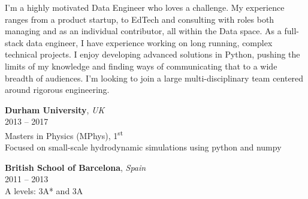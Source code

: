 \documentclass[a4paper]{limecv}
\begin{document}
  
  \begin{cvSidebar}
   

    \begin{cvContact}
    \end{cvContact}
  
    \begin{cvProfile}
      \begin{flushleft}
      I'm a highly motivated Data Engineer who loves a challenge. My experience ranges from a product startup,
      to EdTech and consulting with roles both managing and as an individual contributor, all within the Data space.
      As a full-stack data engineer, I have experience working on long running, complex technical 
      projects. I enjoy developing advanced solutions in Python, pushing the limits of my knowledge and finding ways of 
      communicating that to a wide breadth of audiences. I'm looking to join a large multi-disciplinary team 
      centered around rigorous engineering.
      \end{flushleft}
    \end{cvProfile}

    \begin{cvEducationSide}
      \begin{flushleft}
      \textbf{Durham University}, \textit{UK}\\
      \vspace{0.1cm}
      2013 -- 2017\\
      \vspace{0.1cm} 
      Masters in Physics (MPhys), 1\textsuperscript{st}\\
      \vspace{0.1cm} 
      Focused on small-scale hydrodynamic simulations using python and numpy

      \vspace{0.3cm} 
      \textbf{British School of Barcelona}, \textit{Spain}\\
      \vspace{0.1cm}
      2011 -- 2013\\
      \vspace{0.1cm}
      A levels: 3A* and 3A
      \end{flushleft}
    \end{cvEducationSide}


\end{cvSidebar}
\end{document}
